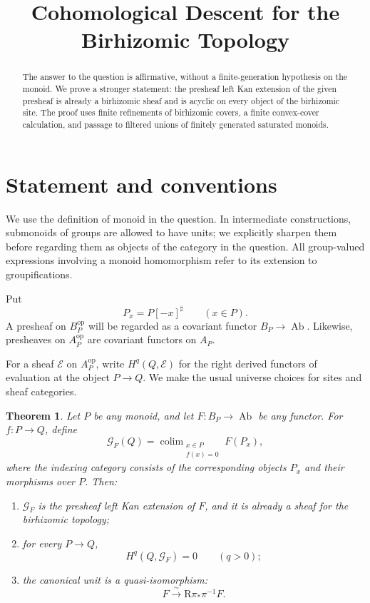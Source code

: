 \documentclass[11pt]{article}
\title{Cohomological Descent for the Birhizomic Topology}
\author{}
\date{}
\newtheorem{theorem}{Theorem}[section]
\theoremstyle{definition}
\theoremstyle{remark}
\DeclareMathOperator{\colim}{colim}
\DeclareMathOperator{\Ab}{Ab}
\newcommand{\cG}{\mathcal G}
\begin{document}
\maketitle

\begin{abstract}
The answer to the question is affirmative, without a finite-generation
hypothesis on the monoid. We prove a stronger statement: the presheaf
left Kan extension of the given presheaf is already a birhizomic sheaf
and is acyclic on every object of the birhizomic site. The proof uses
finite refinements of birhizomic covers, a finite convex-cover
calculation, and passage to filtered unions of finitely generated
saturated monoids.
\end{abstract}

\section{Statement and conventions}

We use the definition of monoid in the question. In intermediate
constructions, submonoids of groups are allowed to have units; we
explicitly sharpen them before regarding them as objects of the
category in the question. All group-valued expressions involving a
monoid homomorphism refer to its extension to groupifications.

Put
\[
P_x=P[-x]^\sharp\qquad(x\in P).
\]
A presheaf on \(B_P^{\mathrm{op}}\) will be regarded as a covariant
functor \(B_P\to\Ab\). Likewise, presheaves on \(A_P^{\mathrm{op}}\)
are covariant functors on \(A_P\).

For a sheaf \(\mathcal E\) on \(A_P^{\mathrm{op}}\), write
\(H^q(Q,\mathcal E)\) for the right derived functors of evaluation at
the object \(P\to Q\). We make the usual universe choices for sites
and sheaf categories.

\begin{theorem}\label{thm:main}
Let \(P\) be any monoid, and let \(F:B_P\to\Ab\) be any functor.
For \(f:P\to Q\), define
\begin{equation}\label{eq:main-formula}
\cG_F(Q)=
\colim_{\substack{x\in P\\f(x)=0}} F(P_x),
\end{equation}
where the indexing category consists of the corresponding objects
\(P_x\) and their morphisms over \(P\). Then:
\begin{enumerate}[label=\textup{(\roman*)}]
\item \(\cG_F\) is the presheaf left Kan extension of \(F\), and it is
already a sheaf for the birhizomic topology;
\item for every \(P\to Q\),
\[
H^q(Q,\cG_F)=0\qquad(q>0);
\]
\item the canonical unit is a quasi-isomorphism:
\[
F \xrightarrow{\ \sim\ } \mathrm R\pi_*\pi^{-1}F.
\]
\end{enumerate}
\end{theorem}
\end{document}
